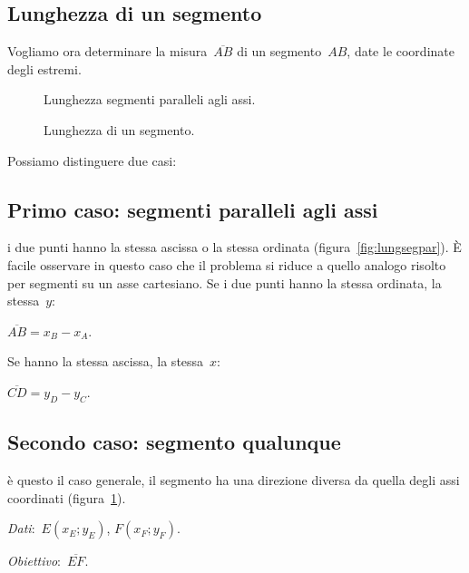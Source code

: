 \subsection{Lunghezza di un segmento}

Vogliamo ora determinare la misura~\(\overline{AB}\) di un segmento~\(AB\), 
date le coordinate degli estremi.

\begin{inaccessibleblock}
 \begin{figure}[h]
 \centering
 \begin{minipage}[t]{.45\textwidth}
  \centering \segmentiparalleli
  \caption{Lunghezza segmenti paralleli agli assi.}\label{fig:lungsegpar}
 \end{minipage}\hfil
 \begin{minipage}[t]{.45\textwidth}
  \centering \lungseg
  \caption{Lunghezza di un segmento.}\label{fig:lungseg}
 \end{minipage}\hfil
\end{figure}
\end{inaccessibleblock}

Possiamo distinguere due casi:

\subsection*{Primo caso: segmenti paralleli agli assi} i due punti hanno la 
stessa ascissa o la stessa ordinata (figura~\ref{fig:lungsegpar}). 
È facile osservare in questo caso che il problema si riduce a quello analogo
risolto per segmenti su un asse cartesiano. Se i due punti hanno la stessa 
ordinata, la stessa~\(y\):

\(\overline{AB} = x_B - x_A\).

Se hanno la stessa ascissa, la stessa~\(x\):

\(\overline{CD} = y_D - y_C\).

\subsection*{Secondo caso: segmento qualunque} è questo il caso generale, 
il segmento ha una 
direzione diversa da quella degli assi coordinati (figura~\ref{fig:lungseg}).

\emph{Dati}:~\(E(x_E; y_E)\), \(F(x_F;y_F)\).

\emph{Obiettivo}:~\(\overline{EF}\).

